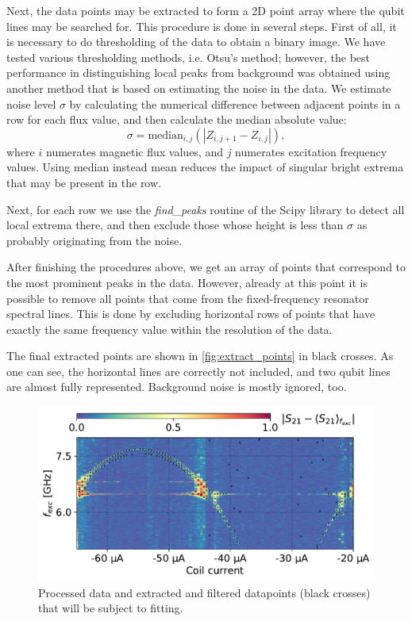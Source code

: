 \documentclass[%
 aip,
 amsmath,amssymb,
 reprint,%
]{revtex4-1}
\begin{document}
Next, the data points may be extracted to form a 2D point array where the qubit lines may be searched for. This procedure is done in several steps. First of all, it is necessary to do thresholding of the data to obtain a binary image. We have tested various thresholding methods, i.e. Otsu's method\cite{otsu1979}; however, the best performance in distinguishing local peaks from background was obtained using another method that is based on estimating the noise in the data. We estimate noise level $\sigma$ by calculating the numerical difference between adjacent points in a row for each flux value, and then calculate the median absolute value: 
\[
\sigma = \text{median}_{i,j}\left( \left| Z_{i,j+1} - Z_{i,j} \right| \right),
\]
where $i$ numerates magnetic flux values, and $j$ numerates excitation frequency values. Using median instead mean reduces the impact of singular bright extrema that may be present in the row.

Next, for each row we use the \textit{find\_peaks} routine of the Scipy library to detect all local extrema there, and then exclude those whose height is less than $\sigma$ as probably originating from the noise.

After finishing the procedures above, we get an array of points that correspond to the most prominent peaks in the data. However, already at this point it is possible to remove all points that come from the fixed-frequency resonator spectral lines. This is done by excluding horizontal rows of points that have exactly the same frequency value within the resolution of the data.

The final extracted points are shown in \autoref{fig:extract_points} in black crosses. As one can see, the horizontal lines are correctly not included, and two qubit lines are almost fully represented. Background noise is mostly ignored, too.


\begin{figure}
	\includegraphics[width=\linewidth]{extract_points}
	\caption{Processed data and extracted and filtered datapoints (black crosses) that will be subject to fitting.}
	\label{fig:extract_points}
\end{figure}
\end{document}
